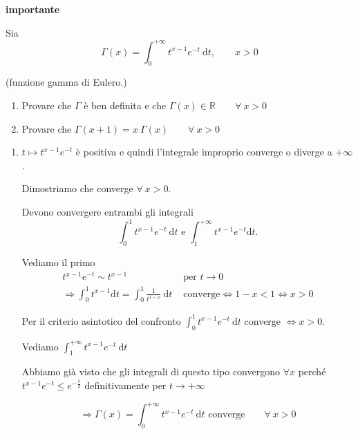 \begin{exbar}
\begin{example} \textbf{importante}
	
	Sia 
	\begin{equation*}
		\Gamma(x) = \int_{0}^{+\infty} t^{x-1} e^{-t} \ \mathrm{d}t, \qquad x > 0
	\end{equation*}
	
	(funzione gamma di Eulero.)
	\begin{enumerate}
		\item Provare che $\Gamma$ è ben definita e che $\Gamma(x) \in \mathbb{R} \qquad \forall \ x > 0$
		\item Provare che $\Gamma(x+1)=x \ \Gamma(x) \qquad \forall \ x > 0$
	\end{enumerate}
	
	\vspace{2em}
	\begin{enumerate}
		\item $t \mapsto t^{x-1} e^{-t}$ è positiva e quindi l'integrale improprio converge o diverge a $+\infty$.
		
		Dimostriamo che converge $\forall \ x > 0$.
		
		Devono convergere entrambi gli integrali
		\begin{equation*}
			\int_{0}^{1} t^{x-1} e^{-t} \ \mathrm{d}t \text{ e } \int_{1}^{+\infty} t^{x-1} e^{-t} \mathrm{d}t.
		\end{equation*}
		
		Vediamo il primo
		\begin{align*}
			t^{x-1} e^{-t} \sim t^{x-1} &\text{ per } t \rightarrow 0
			\\
			\Rightarrow \int_{0}^{1}t^{x-1} \mathrm{d}t =\int_{0}^{1} \frac{1}{t^{1-x}} \ \mathrm{d}t & \text{ converge} \iff 1 - x < 1 \iff x > 0
		\end{align*}
		
		Per il criterio asintotico del confronto $\int_{0}^{1} t^{x-1} e^{-t} \ \mathrm{d}t$ converge $\iff x > 0$.
		
		Vediamo $\int_{1}^{+\infty} t^{x-1} e^{-t} \ \mathrm{d}t$
		
		Abbiamo già visto che gli integrali di questo tipo convergono $\forall x$ perché $t^{x-1} e^{-t} \leq e^{-\frac{t}{2}}$ definitivamente per $t \rightarrow +\infty$
		
		\begin{equation*}
			\Rightarrow \Gamma(x) = \int_{0}^{+\infty} t^{x-1} e^{-t} \ \mathrm{d}t \text{ converge} \qquad \forall \ x >0
		\end{equation*}
		

\end{enumerate}
\end{example}
\end{exbar}

